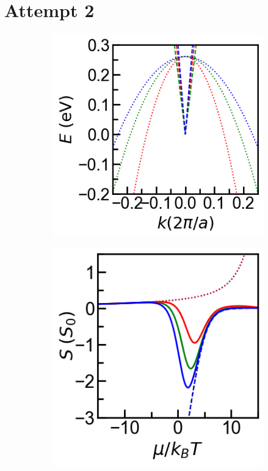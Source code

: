 \documentclass{article}
\begin{document}
\section{Attempt 2}

\begin{figure}[ht]

    \centering
    \begin{subfigure}{0.33\textwidth}
      \includegraphics[width=\textwidth]{../Fig2BM-typeI.png}
      \caption{}
    \end{subfigure}
    \hfil
    \begin{subfigure}{0.33\textwidth}
      \includegraphics[width=\textwidth]{../Seebeck.png}

\end{subfigure}
\end{figure}
\end{document}
